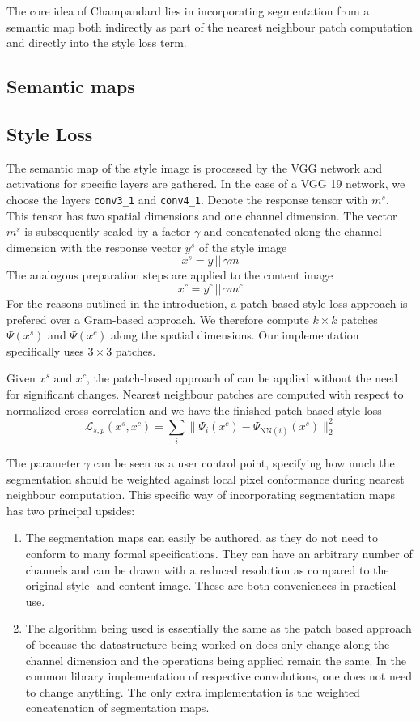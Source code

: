 The core idea of Champandard lies in incorporating segmentation from a semantic map both indirectly as part of the nearest neighbour patch computation and directly into the style loss term.

\subsection{Semantic maps}


\subsection{Style Loss}

The semantic map of the style image is processed by the VGG network and activations for specific layers are gathered. In the case of a VGG 19 network, we choose the layers \texttt{conv3\_1} and \texttt{conv4\_1}. Denote the response tensor with \(m^s\). This tensor has two spatial dimensions and one channel dimension. The vector \(m^s\) is subsequently scaled by a factor \(\gamma\) and concatenated along the channel dimension with the response vector \(y^s\) of the style image
\[x^s = y \,||\,\gamma m \]
The analogous preparation steps are applied to the content image
\[x^c = y^c \,||\,\gamma m^c \]
For the reasons outlined in the introduction, a patch-based style loss approach is prefered over a Gram-based approach. We therefore compute \(k\times k\) patches \(\Psi (x^s)\) and \(\Psi (x^c)\) along the spatial dimensions. Our implementation specifically uses \(3\times 3\) patches. 

Given \(x^s\) and \(x^c\), the patch-based approach of \cite{mrf2016} can be applied without the need for significant changes. Nearest neighbour patches are computed with respect to normalized cross-correlation and we have the finished patch-based style loss
\[\mathcal{L}_{s,p}(x^s,x^c) = \sum_i \|\Psi_i(x^c)-\Psi_{\text{NN}(i)}(x^s)\|_2^2\]

The parameter \(\gamma\) can be seen as a user control point, specifying how much the segmentation should be weighted against local pixel conformance during nearest neighbour computation. This specific way of incorporating segmentation maps has two principal upsides:
\begin{enumerate}
	\item The segmentation maps can easily be authored, as they do not need to conform to many formal specifications. They can have an arbitrary number of channels and can be drawn with a reduced resolution as compared to the original style- and content image. These are both conveniences in practical use.
	\item The algorithm being used is essentially the same as the patch based approach of \cite{mrf2016} because the datastructure being worked on does only change along the channel dimension and the operations being applied remain the same. In the common library implementation of respective convolutions, one does not need to change anything. The only extra implementation is the weighted concatenation of segmentation maps.
\end{enumerate}

